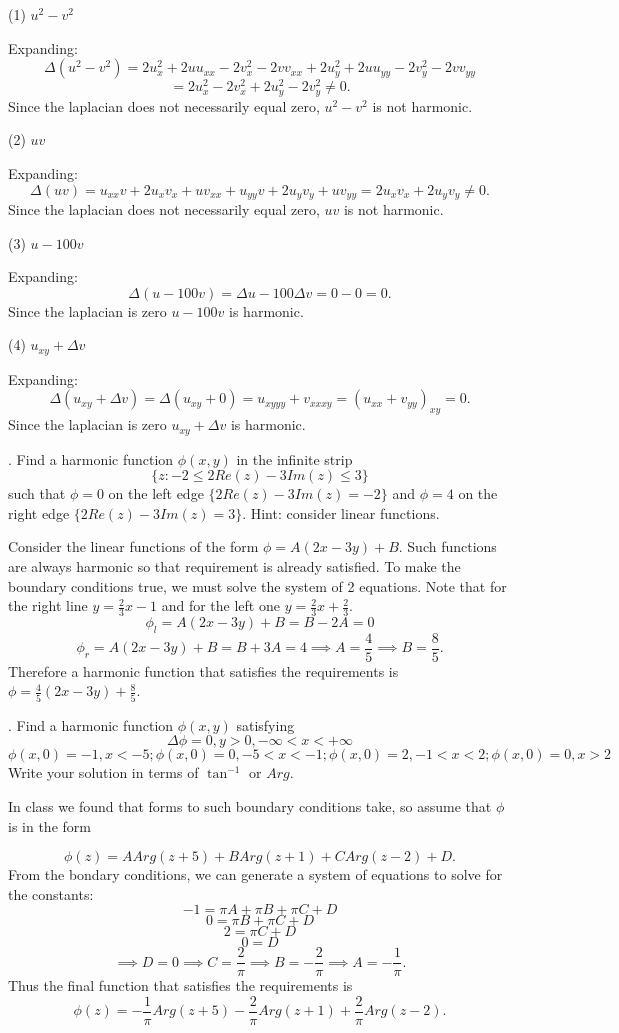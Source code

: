 \documentclass[letterpaper, reqno,11pt]{article}
\begin{document}
(1) $ u^2-v^2$

Expanding:
\[
\Delta(u^2-v^2)=2u_{x}^2+2uu_{x x}-2v_x^2-2vv_{x x}+2u_{y}^2+2uu_{y y}-2v_y^2-2vv_{y y}
\]
\[
=2u_x^2-2v_x^2+2u_y^2-2v_y^2\neq 0
.\]
Since the laplacian does not necessarily equal zero, $u^2-v^2$ is not harmonic. 

(2) $ uv $

Expanding: 
\[
\Delta(uv)=u_{x x}v + 2u_xv_x+uv_{x x}+u_{yy}v+2u_yv_y+uv_{yy}=2u_xv_x+2u_yv_y\neq 0
.\]
Since the laplacian does not necessarily equal zero, $uv$ is not harmonic. 

(3) $ u-100 v$

Expanding: 
\[
\Delta(u-100v)=\Delta u-100\Delta v=0-0=0
.\]
Since the laplacian is zero $u-100v$ is harmonic. 

(4) $ u_{xy}+ \Delta v$

Expanding: 
\[
\Delta(u_{xy}+\Delta v)=\Delta(u_{xy}+0)=u_{xyyy}+v_{x x xy}=(u_{x x}+v_{y y})_{xy}=0
.\]
Since the laplacian is zero $u_{xy}+\Delta v$ is harmonic. 

\medskip

. Find a harmonic function $\phi (x,y)$ in the infinite strip
$$ \{ z: -2 \leq 2Re (z) -3 Im (z)  \leq 3\}$$
such that $ \phi =0$ on the left edge  $\{ 2 Re (z)- 3 Im (z)=-2\}$ and $\phi= 4$ on the right edge $ \{ 2Re (z)- 3 Im (z)=3\}$.  Hint: consider linear functions.

Consider the linear functions of the form $\phi=A(2x-3y)+B$. Such functions are always harmonic so that requirement is already satisfied. To make the boundary conditions true, we must solve the system of 2 equations. Note that for the right line $y=\frac{2}{3}x-1$ and for the left one $y=\frac{2}{3}x+\frac{2}{3}$. 
\[
\phi_l=A(2x-3y)+B=B-2A=0
\]
\[
\phi_r=A(2x-3y)+B=B+3A=4\implies A=\frac{4}{5}\implies B=\frac{8}{5}
.\]
Therefore a harmonic function that satisfies the requirements is $\phi=\frac{4}{5}(2x-3y)+\frac{8}{5}$. 

\medskip

. Find a harmonic function $\phi (x, y)$ satisfying
$$ \Delta \phi=0, y>0, -\infty <x<+\infty $$
$$ \phi (x,0)=-1, x<-5; \phi (x, 0)=0, -5<x<-1; \phi (x,0)=2, -1<x<2; \phi (x,0)=0, x>2 $$
Write your solution in terms of $ \tan^{-1}$ or $Arg$.

In class we found that forms to such boundary conditions take, so assume that $\phi$ is in the form 

\[
\phi(z)=A Arg(z+5)+B Arg(z+1)+ C Arg(z-2)+D
.\]
From the bondary conditions, we can generate a system of equations to solve for the constants: 
\[
-1=\pi A+\pi B+\pi C+D
\]
\[
0=\pi B+\pi C+D
\]
\[
2=\pi C+D
\]
\[
0=D
\]
\[
\implies D=0\implies C=\frac{2}{\pi}\implies B=-\frac{2}{\pi}\implies A=-\frac{1}{\pi}
.\]
Thus the final function that satisfies the requirements is
\[
\phi(z)=-\frac{1}{\pi} Arg(z+5)-\frac{2}{\pi} Arg(z+1)+ \frac{2}{\pi} Arg(z-2)
.\]
\end{document}
